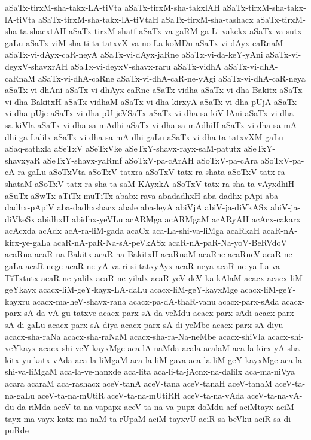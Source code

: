 {aSaTx-tirxM-sha-takx-LA-tiVta
aSaTx-tirxM-sha-takxlAH
aSaTx-tirxM-sha-takx-lA-tiVta
aSaTx-tirxM-sha-takx-lA-tiVtaH
aSaTx-tirxM-sha-tashacx
aSaTx-tirxM-sha-ta-shacxtAH
aSaTx-tirxM-shatf
aSaTx-va-gaRM-ga-Li-vakekx
aSaTx-va-sutx-gaLu
aSaTx-viM-sha-ti-ta-tatxvX-va-no-La-koMDu
aSaTx-vi-dAyx-caRnaM
aSaTx-vi-dAyx-caR-neyA
aSaTx-vi-dAyx-jaRne
aSaTx-vi-da-keY-yAni
aSaTx-vi-deyxV-shavxrAH
aSaTx-vi-deyxV-shavx-raru
aSaTx-vidhA
aSaTx-vi-dhA-caRnaM
aSaTx-vi-dhA-caRne
aSaTx-vi-dhA-caR-ne-yAgi
aSaTx-vi-dhA-caR-neya
aSaTx-vi-dhAni
aSaTx-vi-dhAyx-caRne
aSaTx-vidha
aSaTx-vi-dha-Bakitx
aSaTx-vi-dha-BakitxH
aSaTx-vidhaM
aSaTx-vi-dha-kirxyA
aSaTx-vi-dha-pUjA
aSaTx-vi-dha-pUje
aSaTx-vi-dha-pU-jeVSaTx
aSaTx-vi-dha-sa-kiV-lAni
aSaTx-vi-dha-sa-kiVla
aSaTx-vi-dha-sa-mAdhi
aSaTx-vi-dha-sa-mAdhiH
aSaTx-vi-dha-sa-mA-dhi-ga-Lalilx
aSaTx-vi-dha-sa-mA-dhi-gaLu
aSaTx-vi-dha-ta-tatxvXM-gaLu
aSaq-sathxla
aSeTxV
aSeTxVke
aSeTxY-shavx-rayx-saM-patutx
aSeTxY-shavxyaR
aSeTxY-shavx-yaRmf
aSoTxV-pa-cArAH
aSoTxV-pa-cAra
aSoTxV-pa-cA-ra-gaLu
aSoTxVta
aSoTxV-tatxra
aSoTxV-tatx-ra-shata
aSoTxV-tatx-ra-shataM
aSoTxV-tatx-ra-sha-ta-saM-KAyxkA
aSoTxV-tatx-ra-sha-ta-vAyxdhiH
aSuTx
aSwTx
aTiTx-muTiTx
ababx-rava
abadadhxH
aba-dadhx-pApi
aba-dadhx-pApiV
aba-dadhxshacx
abale
aba-leyA
abiVjA
abiV-ja-diVkASx
abiV-ja-diVkeSx
abidhxH
abidhx-yeVLu
acARMga
acARMgaM
acARyAH
acAcx-cakarx
acAcxda
acAdx
acA-ra-liM-gada
acaCx
aca-La-shi-va-liMga
acaRkaH
acaR-nA-kirx-ye-gaLa
acaR-nA-paR-Na-sA-peVkASx
acaR-nA-paR-Na-yoV-BeRVdoV
acaRna
acaR-na-Bakitx
acaR-na-BakitxH
acaRnaM
acaRne
acaRneV
acaR-ne-gaLa
acaR-nege
acaR-ne-yA-va-ri-si-tatxyAyx
acaR-neya
acaR-ne-ya-La-va-TiTxtutx
acaR-ne-yalilx
acaR-ne-yilalx
acaR-yeV-deV-ka-kAlaM
acacx
acacx-liM-geYkayx
acacx-liM-geY-kayx-LA-daLu
acacx-liM-geY-kayxMge
acacx-liM-geY-kayxru
acacx-ma-heV-shavx-rana
acacx-pa-dA-thaR-vanu
acacx-parx-sAda
acacx-parx-sA-da-vA-gu-tatxve
acacx-parx-sA-da-veMdu
acacx-parx-sAdi
acacx-parx-sA-di-gaLu
acacx-parx-sA-diya
acacx-parx-sA-di-yeMbe
acacx-parx-sA-diyu
acacx-sha-raNa
acacx-sha-raNaM
acacx-sha-ra-Na-neMbe
acacx-shiVla
acacx-shi-veYkayx
acacx-shi-veY-kayxMge
aca-lA-naMda
acala
acalaM
aca-la-kirx-yA-sha-kitx-yu-katx-vAda
aca-la-liMgaM
aca-la-liM-gava
aca-la-liM-geY-kayxMge
aca-la-shi-va-liMgaM
aca-la-ve-nanxde
aca-lita
aca-li-ta-jAcnx-na-dalilx
aca-ma-niVya
acara
acaraM
aca-rashacx
aceV-tanA
aceV-tana
aceV-tanaH
aceV-tanaM
aceV-ta-na-gaLu
aceV-ta-na-mUtiR
aceV-ta-na-mUtiRH
aceV-ta-na-vAda
aceV-ta-na-vA-du-da-riMda
aceV-ta-na-vapapx
aceV-ta-na-va-pupx-doMdu
acf
aciMtayx
aciM-tayx-ma-vayx-katx-ma-naM-ta-rUpaM
aciM-tayxvU
aciR-sa-beVku
aciR-sa-di-puRde
}
